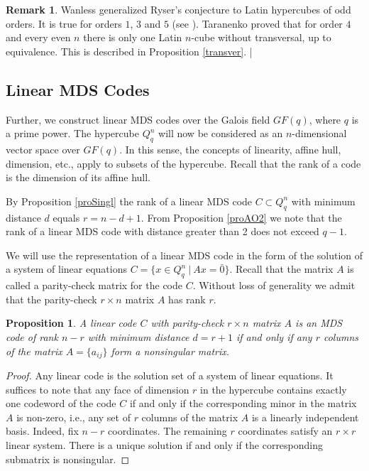 \documentclass[11pt]{article}
\newtheorem{claim}{Proposition}[section]
\theoremstyle{definition}
\newtheorem{remark}{Remark}[section]
\begin{document}
{{{\begin{remark}
Wanless \cite{Wanless}
generalized  Ryser's  conjecture to Latin hypercubes of odd orders. It is true for orders $1$,  $3$ and $5$ (see \cite{PPV}). Taranenko \cite{Taranenko18} proved that for order $4$ and every even $n$  there is only one  Latin $n$-cube without transversal,   up to equivalence. This is described in Proposition \ref{transver}. \label{Tprob}|
\end{remark}



\subsection{Linear MDS Codes}\label{8.3}

Further, we 
construct linear MDS codes over the Galois field $GF(q)$, where $q$ is
a prime power. The hypercube $Q^n_q$ will now be
considered as an $n$-dimensional vector space over 
$GF(q)$. In this sense, the concepts of linearity, affine hull, dimension, etc.,
apply to subsets of the hypercube.
 Recall that   the { rank} of a code is the dimension of its
affine hull.

By Proposition \ref{proSingl}  the rank  of a linear {\rm MDS} code $C\subset
Q_q^n$ with minimum distance $d$ equals $r=n-d+1$. From Proposition
\ref{proAO2} we note that the rank of a linear MDS code with distance
greater than 2 does not exceed $q-1$.

We will use the representation of a linear {\rm MDS} code in the form of the
solution of a system of linear equations $C=\{x\in Q_q^n\ |\ Ax=\bar{0}\}$. Recall that the matrix $A$ 
is called a parity-check matrix for the code $C$. Without loss of generality we admit that the parity-check 
$r\times n$ matrix $A$ has rank $r$.

\begin{claim}\label{MDS-33} A linear code $C$ with parity-check $r\times n$ matrix $A$
is an {\rm
    MDS} code of rank $n-r$ with minimum distance $d=r+1$
if and only if any $r$ columns of the matrix
$A=\{a_{ij}\}$ form a nonsingular matrix.\end{claim}
\begin{proof} Any linear code is the solution set of a system of linear equations.
 It suffices to note that any face of dimension $r$ in the hypercube
 contains exactly one codeword of the code $C$ if and only
if the corresponding minor in the matrix $A$ is non-zero, i.e., any
set of $r$ columns of the matrix $A$ is a linearly independent
basis. Indeed, fix $n-r$ coordinates.
The remaining $r$ coordinates satisfy an $r\times r$ linear system.
There is a unique solution if and only if the corresponding submatrix is nonsingular.
\end{proof}



}}}
\end{document}
